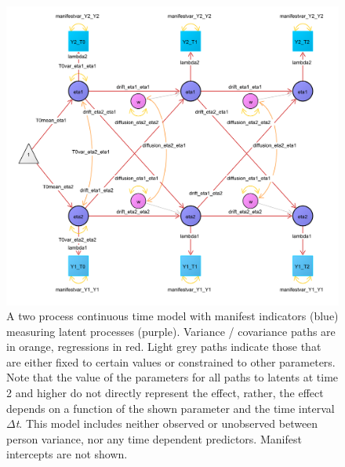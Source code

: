 \documentclass[nojss]{jss}\usepackage[]{graphicx}\usepackage[]{color}
\begin{document}
\begin{figure}[!p]
\includegraphics[width = \textwidth]{pathdiagramtwoprocessbasic}
\caption{ \label{fig:pathdiagramtwoprocessbasic} A two process continuous time model with manifest indicators (blue) measuring latent processes (purple). Variance / covariance paths are in orange, regressions in red. Light grey paths indicate those that are either fixed to certain values or constrained to other parameters. Note that the value of the parameters for all paths to latents at time 2 and higher do not directly represent the effect, rather, the effect depends on a function of the shown parameter and the time interval $\Delta$\textit{t}. This model includes neither observed or unobserved between person variance, nor any time dependent predictors. Manifest intercepts are not shown.}
\end{figure}
\end{document}

